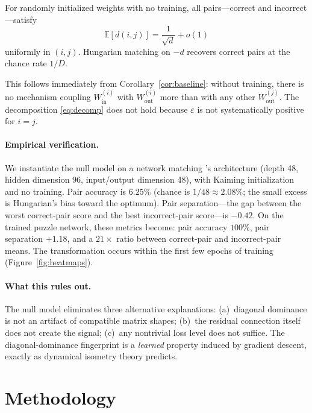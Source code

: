 \documentclass[wcp]{jmlr}
\begin{document}
\begin{corollary}\label{cor:null-model}
For randomly initialized weights with no training, all pairs---correct and incorrect---satisfy
\begin{equation}\label{eq:null}
  \mathbb{E}[d(i,j)] = \frac{1}{\sqrt{d}} + o(1)
\end{equation}
uniformly in $(i,j)$. Hungarian matching on $-d$ recovers correct pairs at the chance rate $1/D$.
\end{corollary}

This follows immediately from Corollary~\ref{cor:baseline}: without training, there is no mechanism coupling $W_{\mathrm{in}}^{(i)}$ with $W_{\mathrm{out}}^{(i)}$ more than with any other $W_{\mathrm{out}}^{(j)}$. The decomposition \eqref{eq:decomp} does not hold because $\varepsilon$ is not systematically positive for $i = j$.

\paragraph{Empirical verification.} We instantiate the null model on a network matching \citet{park2026}'s architecture (depth 48, hidden dimension 96, input/output dimension 48), with Kaiming initialization and no training. Pair accuracy is $6.25\%$ (chance is $1/48 \approx 2.08\%$; the small excess is Hungarian's bias toward the optimum). Pair separation---the gap between the worst correct-pair score and the best incorrect-pair score---is $-0.42$. On the trained puzzle network, these metrics become: pair accuracy $100\%$, pair separation $+1.18$, and a $21\times$ ratio between correct-pair and incorrect-pair means. The transformation occurs within the first few epochs of training (Figure~\ref{fig:heatmaps}).

\paragraph{What this rules out.} The null model eliminates three alternative explanations: (a)~diagonal dominance is not an artifact of compatible matrix shapes; (b)~the residual connection itself does not create the signal; (c)~any nontrivial loss level does not suffice. The diagonal-dominance fingerprint is a \emph{learned} property induced by gradient descent, exactly as dynamical isometry theory predicts.

\section{Methodology}\label{sec:method}
\end{document}
